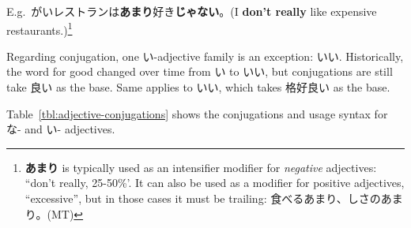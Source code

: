 \documentclass[../nihongo-gakushuu-kyouzai.tex]{subfiles}
\begin{document}
\begin{itemize}

    E.g.\ がいレストランは\textbf{あまり}好き\textbf{じゃない}。(I \textbf{don't really} like expensive restaurants.)\footnote{\textbf{あまり} is typically used as an intensifier modifier for \emph{negative} adjectives: ``don't really, 25-50\%'. It can also be used as a modifier for positive adjectives, ``excessive'', but in those cases it must be trailing: 食べるあまり、しさのあまり。(MT)}

    Regarding conjugation, one い-adjective family is an exception: いい. Historically, the word for good changed over time from い to いい, but conjugations are still take 良い as the base. Same applies to いい, which takes 格好良い as the base. %
\end{itemize}

Table~\ref{tbl:adjective-conjugations} shows the conjugations and usage syntax for な- and い- adjectives.
\end{document}
